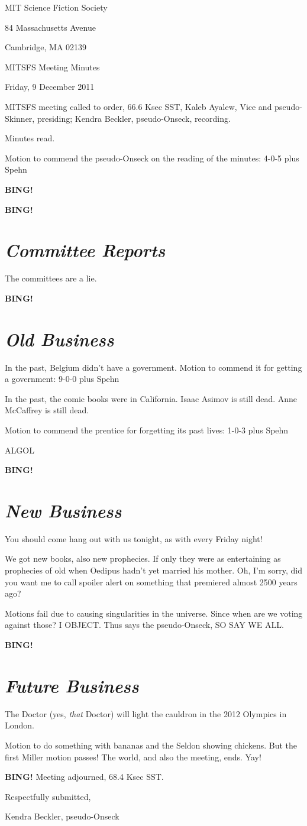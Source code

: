 \documentclass[10pt]{article}
\newcommand{\bing}{{\bf BING!} }
\newcommand{\goto}[1]{\bing \vskip 12pt \section*{{\em{#1}}}}
\newcommand{\ps}{ plus Spehn\xspace}
\newcommand{\skinner}{Kaleb Ayalew, Vice and pseudo-Skinner}
\newcommand{\onseck}{Kendra Beckler, pseudo-Onseck}
\newcommand{\meetingdate}{Friday, 9 December 2011}
\begin{document}
\begin{center}

MIT Science Fiction Society

84 Massachusetts Avenue

Cambridge, MA 02139

\vspace{12pt}

MITSFS Meeting Minutes

\meetingdate

\end{center}

\vspace{18pt}

\setlength{\parskip}{6pt}

\noindent
MITSFS meeting called to order, 66.6 Ksec SST,
\skinner, presiding; \onseck, recording.

Minutes read.

Motion to commend the pseudo-Onseck on the reading of the minutes: 4-0-5 \ps

\bing

\goto{Committee Reports}

The committees are a lie.

\goto{Old Business}

In the past, Belgium didn't have a government.  Motion to commend it for getting a government: 9-0-0 \ps

In the past, the comic books were in California.  Isaac Asimov is still dead.  Anne McCaffrey is still dead.

Motion to commend the prentice for forgetting its past lives: 1-0-3 \ps

ALGOL

\goto{New Business}

You should come hang out with us tonight, as with every Friday night!

We got new books, also new prophecies.  If only they were as entertaining as prophecies of old when Oedipus hadn't yet married his mother.  Oh, I'm sorry, did you want me to call spoiler alert on something that premiered almost 2500 years ago?

Motions fail due to causing singularities in the universe.  Since when are we voting against those?  I OBJECT.  Thus says the pseudo-Onseck, SO SAY WE ALL.

\goto{Future Business}

The Doctor (yes, \textit{that} Doctor) will light the cauldron in the 2012 Olympics in London.

Motion to do something with bananas and the Seldon showing chickens.  But the first Miller motion passes!  The world, and also the meeting, ends.  Yay!

\bing
\noindent
Meeting adjourned, 68.4 Ksec SST.

\vspace{18pt}

\centerline{Respectfully submitted,}
\centerline{\onseck}
\end{document}
